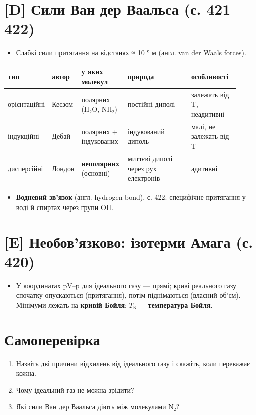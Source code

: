 \documentclass[11pt,a4paper,oneside]{book}
\begin{document}
\section*{[D] Сили Ван дер Ваальса (с. 421–422)}
\begin{itemize}
\item Слабкі сили притягання на відстанях ≈ 10⁻⁹ м (англ. van der Waals forces).
\end{itemize}
{\footnotesize
\begin{longtable}{>{\raggedright\arraybackslash}p{0.138\linewidth}>{\raggedright\arraybackslash}p{0.069\linewidth}>{\raggedright\arraybackslash}p{0.207\linewidth}>{\raggedright\arraybackslash}p{0.288\linewidth}>{\raggedright\arraybackslash}p{0.218\linewidth}}
\toprule
\textbf{тип} & \textbf{автор} & \textbf{у яких молекул} & \textbf{природа} & \textbf{особливості} \\
\midrule
\endhead
орієнтаційні & Кеєзом & полярних (H₂O, NH₃) & постійні диполі & залежать від T, неадитивні \\
індукційні & Дебай & полярних + індукованих & індукований диполь & малі, не залежать від T \\
дисперсійні & Лондон & \textbf{неполярних} (основні) & миттєві диполі через рух електронів & адитивні \\
\bottomrule
\end{longtable}
}
\begin{itemize}
\item \textbf{Водневий зв'язок} (англ. hydrogen bond), с. 422: специфічне притягання у воді й спиртах через групи OH.
\end{itemize}

\section*{[E] Необов'язково: ізотерми Амага (с. 420)}
\begin{itemize}
\item У координатах pV–p для ідеального газу — прямі; криві реального газу спочатку опускаються (притягання), потім піднімаються (власний об'єм). Мінімуми лежать на \textbf{кривій Бойля}; $T_{\text{Б}}$ — \textbf{температура Бойля}.
\end{itemize}

\section*{Самоперевірка}
\begin{enumerate}
\item Назвіть дві причини відхилень від ідеального газу і скажіть, коли переважає кожна.
\item Чому ідеальний газ не можна зрідити?
\item Які сили Ван дер Ваальса діють між молекулами N₂?
\end{enumerate}
\end{document}
